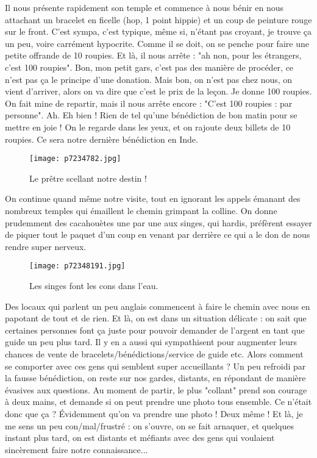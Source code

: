 \documentclass{book}
\begin{document}
Il nous présente rapidement son temple et commence à nous bénir en nous attachant un bracelet en ficelle (hop, 1 point hippie) et un coup de peinture rouge sur le front. C'est sympa, c'est typique, même si, n'étant pas croyant, je trouve ça un peu, voire carrément hypocrite. Comme il se doit, on se penche pour faire une petite offrande de 10 roupies. Et là, il nous arrête : "ah non, pour les étrangers, c'est 100 roupies". Bon, mon petit gars, c'est pas des manière de procéder, ce n'est pas ça le principe d'une donation. Mais bon, on n'est pas chez nous, on vient d'arriver, alors on va dire que c'est le prix de la leçon. Je donne 100 roupies. On fait mine de repartir, mais il nous arrête encore : "C'est 100 roupies : par personne". Ah. Eh bien ! Rien de tel qu'une bénédiction de bon matin pour se mettre en joie ! On le regarde dans les yeux, et on rajoute deux billets de 10 roupies. Ce sera notre dernière bénédiction en Inde.


\begin{figure}[h]
\centering
\texttt{[image: p7234782.jpg]}
\caption*{Le prêtre scellant notre destin !}
\end{figure}

On continue quand même notre visite, tout en ignorant les appels émanant des nombreux temples qui émaillent le chemin grimpant la colline. On donne prudemment des cacahouètes une par une aux singes, qui hardis, préfèrent essayer de piquer tout le paquet d'un coup en venant par derrière ce qui a le don de nous rendre super nerveux.


\begin{figure}[h]
\centering
\texttt{[image: p72348191.jpg]}
\caption*{Les singes font les cons dans l'eau.}
\end{figure}

Des locaux qui parlent un peu anglais commencent à faire le chemin avec nous en papotant de tout et de rien. Et là, on est dans un situation délicate : on sait que certaines personnes font ça juste pour pouvoir demander de l'argent en tant que guide un peu plus tard. Il y en a aussi qui sympathisent pour augmenter leurs chances de vente de bracelets/bénédictions/service de guide etc. Alors comment se comporter avec ces gens qui semblent super accueillants ? Un peu refroidi par la fausse bénédiction, on reste sur nos gardes, distants, en répondant de manière évasives aux questions. Au moment de partir, le plus "collant" prend son courage à deux mains, et demande si on peut prendre une photo tous ensemble. Ce n'était donc que ça ? Évidemment qu'on va prendre une photo ! Deux même ! Et là, je me sens un peu con/mal/frustré : on s'ouvre, on se fait arnaquer, et quelques instant plus tard, on est distants et méfiants avec des gens qui voulaient sincèrement faire notre connaissance...
\end{document}
